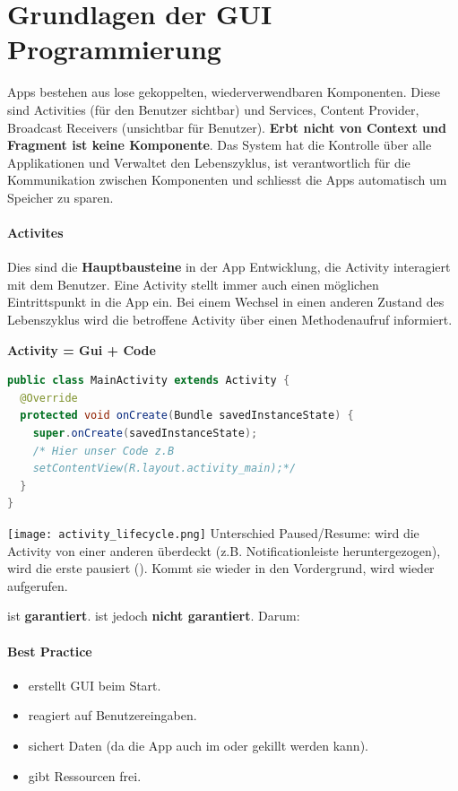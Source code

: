 \section{Grundlagen der GUI Programmierung}
Apps bestehen aus lose gekoppelten, wiederverwendbaren Komponenten. Diese sind Activities (für den Benutzer sichtbar) und Services, Content Provider, Broadcast Receivers (unsichtbar für Benutzer). \textbf{Erbt nicht von Context und Fragment ist keine Komponente}. Das System hat die Kontrolle über alle Applikationen und Verwaltet den Lebenszyklus, ist verantwortlich für die Kommunikation zwischen Komponenten und schliesst die Apps automatisch um Speicher zu sparen.
\paragraph{Activites} Dies sind die \textbf{Hauptbausteine} in der App Entwicklung, die Activity interagiert mit dem Benutzer. Eine Activity stellt immer auch einen möglichen Eintrittspunkt in die App ein. Bei einem Wechsel in einen anderen Zustand des Lebenszyklus wird die betroffene Activity über einen Methodenaufruf informiert.

\textbf{Activity = Gui + Code}
\begin{lstlisting}[language=java]
public class MainActivity extends Activity {
  @Override
  protected void onCreate(Bundle savedInstanceState) {
    super.onCreate(savedInstanceState);
    /* Hier unser Code z.B
    setContentView(R.layout.activity_main);*/
  }
}
\end{lstlisting}
\texttt{[image: activity\_lifecycle.png]}
Unterschied Paused/Resume: wird die Activity von einer anderen überdeckt (z.B. Notificationleiste heruntergezogen), wird die erste pausiert (). Kommt sie wieder in den Vordergrund, wird wieder  aufgerufen.

 ist \textbf{garantiert}.  ist jedoch \textbf{nicht garantiert}. Darum:

\paragraph{Best Practice}

\begin{itemize}
  \item {} erstellt GUI beim Start.
  \item {} reagiert auf Benutzereingaben.
  \item {} sichert Daten (da die App auch im  oder  gekillt werden kann).
  \item {} gibt Ressourcen frei.
\end{itemize}

